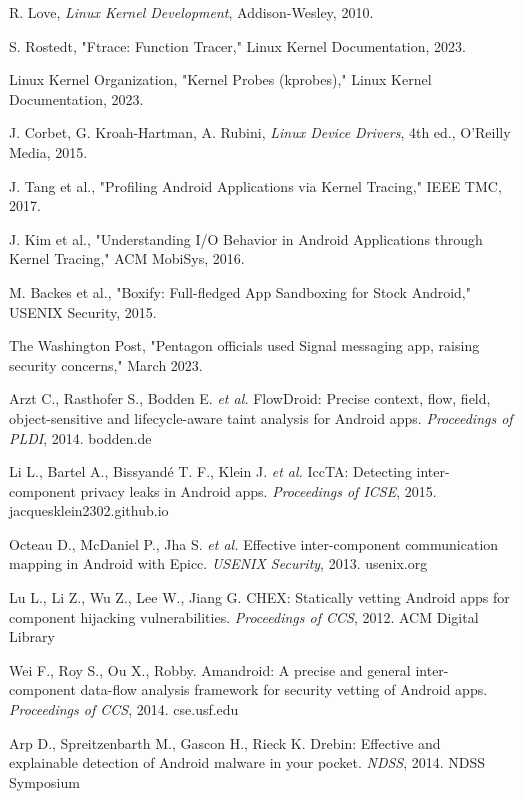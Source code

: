 \documentclass[a4paper,12pt]{report}
\begin{document}
\begin{thebibliography}{99}
     R. Love, \textit{Linux Kernel Development}, Addison-Wesley, 2010.

     S. Rostedt, "Ftrace: Function Tracer," Linux Kernel Documentation, 2023.

     Linux Kernel Organization, "Kernel Probes (kprobes)," Linux Kernel Documentation, 2023.

     J. Corbet, G. Kroah-Hartman, A. Rubini, \textit{Linux Device Drivers}, 4th ed., O'Reilly Media, 2015.

     J. Tang et al., "Profiling Android Applications via Kernel Tracing," IEEE TMC, 2017.

     J. Kim et al., "Understanding I/O Behavior in Android Applications through Kernel Tracing," ACM MobiSys, 2016.

     M. Backes et al., "Boxify: Full-fledged App Sandboxing for Stock Android," USENIX Security, 2015.

     The Washington Post, "Pentagon officials used Signal messaging app, raising security concerns," March 2023.

    Arzt C., Rasthofer S., Bodden E. \emph{et al.} FlowDroid: Precise context, flow, field, object-sensitive and lifecycle-aware taint analysis for Android apps. \textit{Proceedings of PLDI}, 2014. bodden.de

    Li L., Bartel A., Bissyandé T. F., Klein J. \emph{et al.} IccTA: Detecting inter-component privacy leaks in Android apps. \textit{Proceedings of ICSE}, 2015. jacquesklein2302.github.io

    Octeau D., McDaniel P., Jha S. \emph{et al.} Effective inter-component communication mapping in Android with Epicc. \textit{USENIX Security}, 2013. usenix.org

    Lu L., Li Z., Wu Z., Lee W., Jiang G. CHEX: Statically vetting Android apps for component hijacking vulnerabilities. \textit{Proceedings of CCS}, 2012. ACM Digital Library

    Wei F., Roy S., Ou X., Robby. Amandroid: A precise and general inter-component data-flow analysis framework for security vetting of Android apps. \textit{Proceedings of CCS}, 2014. cse.usf.edu

    Arp D., Spreitzenbarth M., Gascon H., Rieck K. Drebin: Effective and explainable detection of Android malware in your pocket. \textit{NDSS}, 2014. NDSS Symposium


\end{thebibliography}
\end{document}
